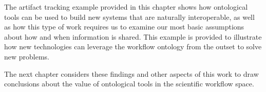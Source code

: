 The artifact tracking example provided in this chapter shows how ontological
tools can be used to build new systems that are naturally interoperable, as
well as how this type of work requires us to examine our most basic assumptions
about how and when information is shared. This example is provided to
illustrate how new technologies can leverage the workflow ontology from the
outset to solve new problems.


The next chapter considers these findings and other aspects of this work to
draw conclusions about the value of ontological tools in the scientific workflow
space.